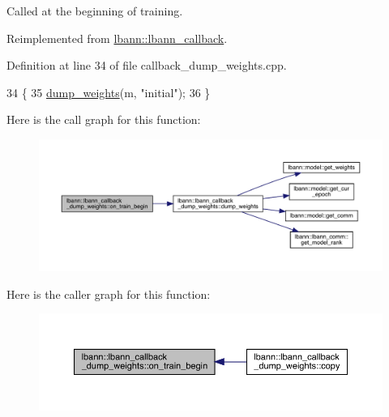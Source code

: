 Called at the beginning of training. 

Reimplemented from \hyperlink{classlbann_1_1lbann__callback_a7c8f0d211967ccc5219144e92571ab26}{lbann\+::lbann\+\_\+callback}.



Definition at line 34 of file callback\+\_\+dump\+\_\+weights.\+cpp.


\begin{DoxyCode}
34                                                          \{
35   \hyperlink{classlbann_1_1lbann__callback__dump__weights_a5902fb87255b410a5d777ea385813416}{dump\_weights}(m, \textcolor{stringliteral}{"initial"});
36 \}
\end{DoxyCode}
Here is the call graph for this function\+:\nopagebreak
\begin{figure}[H]
\begin{center}
\leavevmode
\includegraphics[width=350pt]{classlbann_1_1lbann__callback__dump__weights_a46db01d535414a0965caae709a08a150_cgraph}
\end{center}
\end{figure}
Here is the caller graph for this function\+:\nopagebreak
\begin{figure}[H]
\begin{center}
\leavevmode
\includegraphics[width=350pt]{classlbann_1_1lbann__callback__dump__weights_a46db01d535414a0965caae709a08a150_icgraph}
\end{center}
\end{figure}
\mbox{\label{classlbann_1_1lbann__callback__dump__weights_a6f4608e843c2d33e1082498ba34dd8e0}} 
